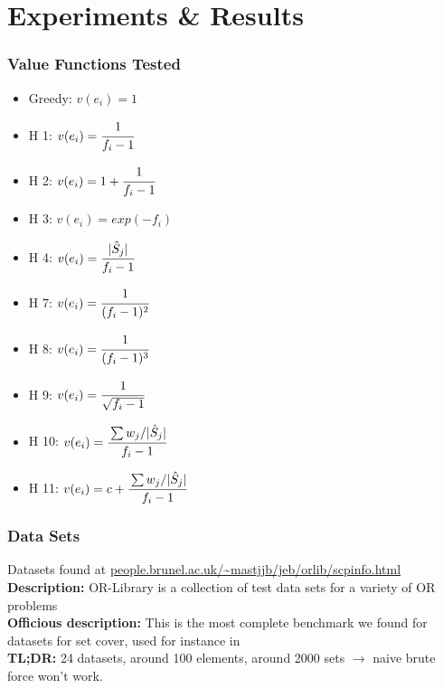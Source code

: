 \documentclass[xcolor=dvipsnames]{beamer}
\begin{document}
\section{Experiments \& Results}
\begin{frame}
\frametitle{Value Functions Tested}
\begin{minipage}{0.50\textwidth}
\begin{itemize}
\item Greedy: $v(e_i) = 1$
\item H 1: $v(e_i) = \cfrac{1}{f_i -1}$
\item H 2: $v(e_i) = 1+\cfrac{1}{f_i -1}$
\item H 3: $v(e_i) = exp(-f_i)$
\item H 4: $v(e_i) = \cfrac{|\hat{S}_j|}{f_i -1}$
\item H 7: $v(e_i) = \cfrac{1}{(f_i -1)^2}$
\end{itemize}
\end{minipage}%
\begin{minipage}{0.50\textwidth}
\begin{itemize}
\item H 8: $v(e_i) = \cfrac{1}{(f_i -1)^3}$
\item H 9: $v(e_i) = \cfrac{1}{\sqrt{f_i -1}}$
\item H 10: $v(e_i) = \cfrac{\sum w_j/|\hat{S}_j|}{f_i -1}$
\item H 11: $v(e_i) = c + \cfrac{\sum w_j/|\hat{S}_j|}{f_i -1}$
\end{itemize}
\end{minipage}
\end{frame}

\begin{frame}
\frametitle{Data Sets}
Datasets found at \url{people.brunel.ac.uk/~mastjjb/jeb/orlib/scpinfo.html} \\
\textbf{Description:} OR-Library is a collection of test data sets for a variety of OR problems \\
\textbf{Officious description:} This is the most complete benchmark we found for datasets for set cover, used for instance in \cite{David} \\
\textbf{TL;DR:} 24 datasets, around 100 elements, around 2000 sets $\rightarrow$ naive brute force won't work.
\end{frame}
\end{document}
